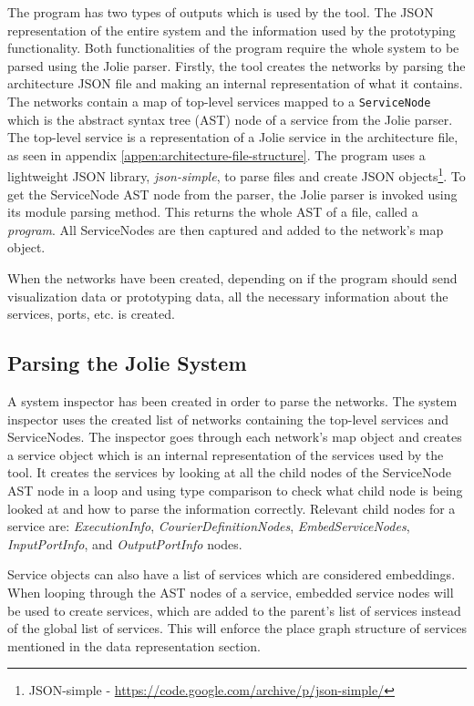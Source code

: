 The \javatoolname[] program has two types of outputs which is used by the tool. The JSON representation of the entire system and the information used by the prototyping functionality. Both functionalities of the \javatoolname[] program require the whole system to be parsed using the Jolie parser.
Firstly, the tool creates the networks by parsing the architecture JSON file and making an internal representation of what it contains. The networks contain a map of top-level services mapped to a \texttt{ServiceNode} which is the abstract syntax tree (AST) node of a service from the Jolie parser. The top-level service is a representation of a Jolie service in the architecture file, as seen in appendix \ref*{appen:architecture-file-structure}.
The \javatoolname[] program uses a lightweight JSON library, \textit{json-simple}, to parse files and create JSON objects\footnote{JSON-simple - \url{https://code.google.com/archive/p/json-simple/}}.
To get the ServiceNode AST node from the parser, the Jolie parser is invoked using its module parsing method. This returns the whole AST of a file, called a \textit{program}. All ServiceNodes are then captured and added to the network's map object.

When the networks have been created, depending on if the program should send visualization data or prototyping data, all the necessary information about the services, ports, etc. is created.
\subsection{Parsing the Jolie System}
A system inspector has been created in order to parse the networks.
The system inspector uses the created list of networks containing the top-level services and ServiceNodes.
The inspector goes through each network's map object and creates a service object which is an internal representation of the services used by the tool.
It creates the services by looking at all the child nodes of the ServiceNode AST node in a loop and using type comparison to check what child node is being looked at and how to parse the information correctly.
Relevant child nodes for a service are: \textit{ExecutionInfo}, \textit{CourierDefinitionNodes}, \textit{EmbedServiceNodes}, \textit{InputPortInfo}, and \textit{OutputPortInfo} nodes.

Service objects can also have a list of services which are considered embeddings. When looping through the AST nodes of a service, embedded service nodes will be used to create services, which are added to the parent's list of services instead of the global list of services.
This will enforce the place graph structure of services mentioned in the data representation section.

